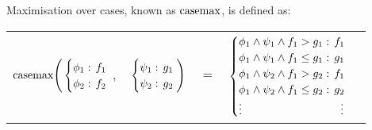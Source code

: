 Maximisation over cases, known as $\mathrm{casemax}$, is defined as:
{\footnotesize 
    \abovedisplayskip=0pt
    \belowdisplayskip=0pt
    \begin{center}
        \begin{tabular}{r c c c l}
            \hspace{-7mm} 
            
            $\mathrm{casemax} \Bigg(
            \begin{cases}
            \phi_1: \hspace{-1mm} & \hspace{-1mm} f_1 \\ 
            \phi_2: \hspace{-1mm} & \hspace{-1mm} f_2 \\ 
            \end{cases}$
            $,$
            &
            \hspace{-4mm}
            $\begin{cases}
            \psi_1: \hspace{-1mm} & \hspace{-1mm} g_1 \\ 
            \psi_2: \hspace{-1mm} & \hspace{-1mm} g_2 \\ 
            \end{cases} \Bigg)$
            &
            \hspace{-4mm} 
            $ = $
            &
            \hspace{-4mm}
            $\begin{cases}
            \phi_1 \wedge \psi_1 \wedge f_1 > g_1    : & \hspace{-2mm} f_1 \\ 
            \phi_1 \wedge \psi_1 \wedge f_1 \leq g_1 : & \hspace{-2mm} g_1 \\ 
            \phi_1 \wedge \psi_2 \wedge f_1 > g_2    : & \hspace{-2mm} f_1 \\ 
            \phi_1 \wedge \psi_2 \wedge f_1 \leq g_2 : & \hspace{-2mm} g_2 \\ 
            \vdots & \vdots
            \end{cases}$
        \end{tabular}
    \end{center}
}%

